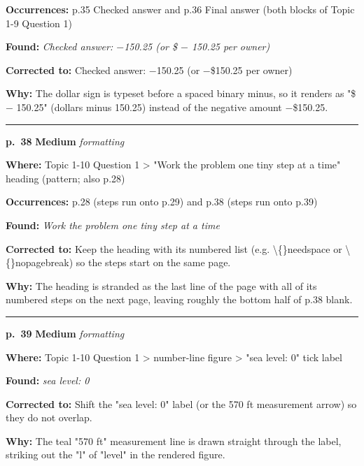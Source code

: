 \documentclass[11pt]{article}
\newcommand{\sevmed}[1]{\textcolor{orange!80!black}{\textbf{#1}}}
\begin{document}
\noindent\textbf{Occurrences: }p.35 Checked answer and p.36 Final answer (both blocks of Topic 1-9 Question 1)\par
\noindent\textbf{Found: }\textit{Checked answer: $-$150.25 (or \$ $-$ 150.25 per owner)}\par
\noindent\textbf{Corrected to: }Checked answer: $-$150.25 (or $-$\$150.25 per owner)\par
\noindent\textbf{Why: }The dollar sign is typeset before a spaced binary minus, so it renders as "\$ $-$ 150.25" (dollars minus 150.25) instead of the negative amount $-$\$150.25.\par\vspace{4pt}
\noindent\rule{\textwidth}{0.4pt}\par\nobreak\vspace{2pt}
\noindent\textbf{p.~38} \quad \sevmed{Medium} \quad \textit{formatting}\par
\noindent\textbf{Where: }Topic 1-10 Question 1 > "Work the problem one tiny step at a time" heading (pattern; also p.28)\par
\noindent\textbf{Occurrences: }p.28 (steps run onto p.29) and p.38 (steps run onto p.39)\par
\noindent\textbf{Found: }\textit{Work the problem one tiny step at a time}\par
\noindent\textbf{Corrected to: }Keep the heading with its numbered list (e.g. \textbackslash\{\}needspace or \textbackslash\{\}nopagebreak) so the steps start on the same page.\par
\noindent\textbf{Why: }The heading is stranded as the last line of the page with all of its numbered steps on the next page, leaving roughly the bottom half of p.38 blank.\par\vspace{4pt}
\noindent\rule{\textwidth}{0.4pt}\par\nobreak\vspace{2pt}
\noindent\textbf{p.~39} \quad \sevmed{Medium} \quad \textit{formatting}\par
\noindent\textbf{Where: }Topic 1-10 Question 1 > number-line figure > "sea level: 0" tick label\par
\noindent\textbf{Found: }\textit{sea level: 0}\par
\noindent\textbf{Corrected to: }Shift the "sea level: 0" label (or the 570 ft measurement arrow) so they do not overlap.\par
\noindent\textbf{Why: }The teal "570 ft" measurement line is drawn straight through the label, striking out the "l" of "level" in the rendered figure.\par\vspace{4pt}
\end{document}
